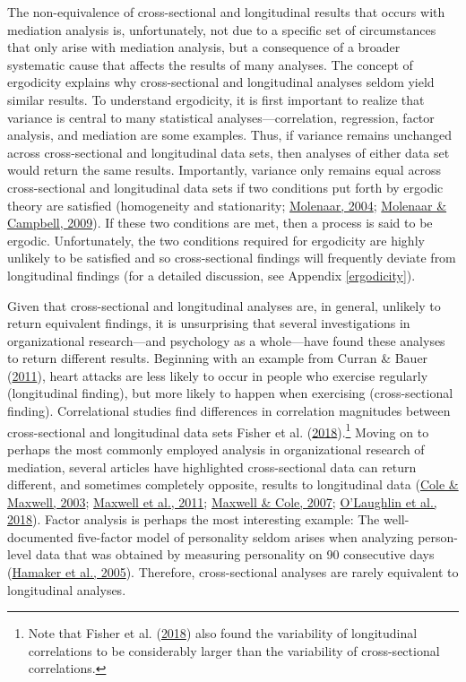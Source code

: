 \documentclass[
12pt, %
twoside,
english]{guelphthesis}
\begin{document}
The non-equivalence of cross-sectional and longitudinal results that occurs with mediation analysis is, unfortunately, not due to a specific set of circumstances that only arise with mediation analysis, but a consequence of a broader systematic cause that affects the results of many analyses. The concept of ergodicity explains why cross-sectional and longitudinal analyses seldom yield similar results. To understand ergodicity, it is first important to realize that variance is central to many statistical analyses---correlation, regression, factor analysis, and mediation are some examples. Thus, if variance remains unchanged across cross-sectional and longitudinal data sets, then analyses of either data set would return the same results. Importantly, variance only remains equal across cross-sectional and longitudinal data sets if two conditions put forth by ergodic theory are satisfied (homogeneity and stationarity; \protect\hyperlink{ref-molenaar2004}{Molenaar, 2004}; \protect\hyperlink{ref-molenaar2009}{Molenaar \& Campbell, 2009}). If these two conditions are met, then a process is said to be ergodic. Unfortunately, the two conditions required for ergodicity are highly unlikely to be satisfied and so cross-sectional findings will frequently deviate from longitudinal findings (for a detailed discussion, see Appendix \ref{ergodicity}).



Given that cross-sectional and longitudinal analyses are, in general, unlikely to return equivalent findings, it is unsurprising that several investigations in organizational research---and psychology as a whole---have found these analyses to return different results. Beginning with an example from Curran \& Bauer (\protect\hyperlink{ref-curran2011}{2011}), heart attacks are less likely to occur in people who exercise regularly (longitudinal finding), but more likely to happen when exercising (cross-sectional finding). Correlational studies find differences in correlation magnitudes between cross-sectional and longitudinal data sets Fisher et al. (\protect\hyperlink{ref-fisher2018}{2018}).\footnote{Note that Fisher et al. (\protect\hyperlink{ref-fisher2018}{2018}) also found the variability of longitudinal correlations to be considerably larger than the variability of cross-sectional correlations.} Moving on to perhaps the most commonly employed analysis in organizational research of mediation, several articles have highlighted cross-sectional data can return different, and sometimes completely opposite, results to longitudinal data (\protect\hyperlink{ref-cole2003}{Cole \& Maxwell, 2003}; \protect\hyperlink{ref-maxwell2011}{Maxwell et al., 2011}; \protect\hyperlink{ref-maxwell2007}{Maxwell \& Cole, 2007}; \protect\hyperlink{ref-olaughlin2018}{O'Laughlin et al., 2018}). Factor analysis is perhaps the most interesting example: The well-documented five-factor model of personality seldom arises when analyzing person-level data that was obtained by measuring personality on 90 consecutive days (\protect\hyperlink{ref-hamaker2005}{Hamaker et al., 2005}). Therefore, cross-sectional analyses are rarely equivalent to longitudinal analyses.
\end{document}
